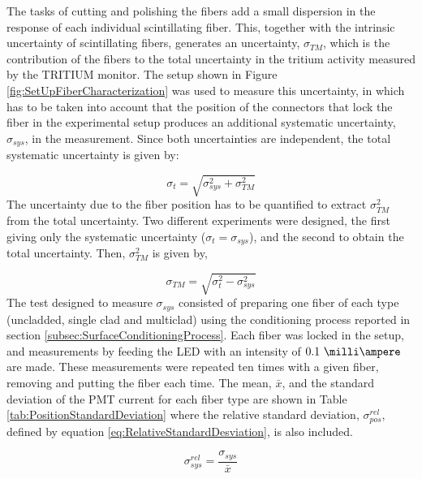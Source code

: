 The tasks of cutting and polishing the fibers add a small dispersion in the response of each individual scintillating fiber. This, together with the intrinsic uncertainty of scintillating fibers, generates an uncertainty, $\sigma_{TM}$, which is the contribution of the fibers to the total uncertainty in the tritium activity measured by the TRITIUM monitor. The setup shown in Figure \ref{fig:SetUpFiberCharacterization} was used to measure this uncertainty, in which has to be taken into account that the position of the connectors that lock the fiber in the experimental setup produces an additional systematic uncertainty, $\sigma_{sys}$, in the measurement. Since both uncertainties are independent, the total systematic uncertainty is given by:

\begin{equation}
\sigma_{t} = \sqrt{\sigma^2_{sys} + \sigma^2_{TM} }
\label{eq:TotalUncertaintyFiberCharacterization}
\end{equation}
The uncertainty due to the fiber position has to be quantified to extract $\sigma^2_{TM}$ from the total uncertainty. Two different experiments were designed, the first giving only the systematic uncertainty ($\sigma_{t} = \sigma_{sys}$), and the second to obtain the total uncertainty. Then, $\sigma^2_{TM}$ is given by,

\begin{equation}
\sigma_{TM} = \sqrt{\sigma^2_{t} - \sigma^2_{sys} }
\label{eq:TMUncertaintyFiberCharacterization}
\end{equation}
The test designed to measure $\sigma_{sys}$ consisted of preparing one fiber of each type (uncladded, single clad and multiclad) using the conditioning process reported in section \ref{subsec:SurfaceConditioningProcess}. Each fiber was locked in the setup, and measurements by feeding the LED with an intensity of $0.1~\milli\ampere$  are made. These measurements were repeated ten times with a given fiber, removing and putting the fiber each time. The mean, $\bar{x}$, and the standard deviation of the PMT current for each fiber type are shown in Table \ref{tab:PositionStandardDeviation} where the relative standard deviation, $\sigma^{rel}_{pos}$, defined by equation \ref{eq:RelativeStandardDesviation}, is also included.

\begin{equation}
\sigma^{rel}_{sys} = \frac{\sigma_{sys}}{\bar{x}}
\label{eq:RelativeStandardDesviation}
\end{equation}

